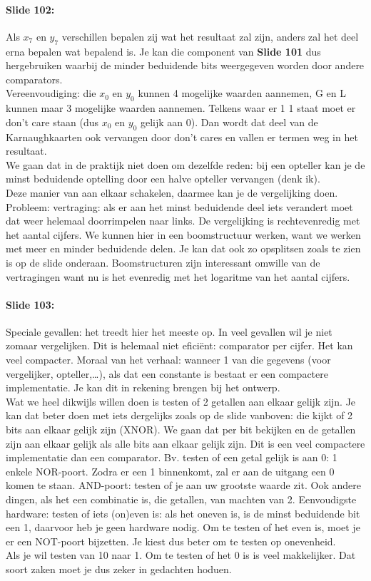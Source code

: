 \documentclass[10pt,a4paper]{book}
\begin{document}
\paragraph{Slide 102:} Als $x_7$ en $y_7$ verschillen bepalen zij wat het resultaat zal zijn, anders zal het deel erna bepalen wat bepalend is. Je kan die component van \textbf{Slide 101} dus hergebruiken waarbij de minder beduidende bits weergegeven worden door andere comparators.\\
Vereenvoudiging: die $x_0$ en $y_0$ kunnen 4 mogelijke waarden aannemen, G en L kunnen maar 3 mogelijke waarden aannemen. Telkens waar er 1 1 staat moet er don't care staan (dus $x_0$ en $y_0$ gelijk aan 0). Dan wordt dat deel van de Karnaughkaarten ook vervangen door don't cares en vallen er termen weg in het resultaat.\\
We gaan dat in de praktijk niet doen om dezelfde reden: bij een opteller kan je de minst beduidende optelling door een halve opteller vervangen (denk ik).\\
Deze manier van aan elkaar schakelen, daarmee kan je de vergelijking doen. Probleem: vertraging: als er aan het minst beduidende deel iets verandert moet dat weer helemaal doorrimpelen naar links. De vergelijking is rechtevenredig met het aantal cijfers. We kunnen hier in een boomstructuur werken, want we werken met meer en minder beduidende delen. Je kan dat ook zo opsplitsen zoals te zien is op de slide onderaan. Boomstructuren zijn interessant omwille van de vertragingen want nu is het evenredig met het logaritme van het aantal cijfers.

\paragraph{Slide 103:} Speciale gevallen: het treedt hier het meeste op. In veel gevallen wil je niet zomaar vergelijken. Dit is helemaal niet efici\"ent: comparator per cijfer. Het kan veel compacter. Moraal van het verhaal: wanneer 1 van die gegevens (voor vergelijker, opteller,\ldots), als dat een constante is bestaat er een compactere implementatie. Je kan dit in rekening brengen bij het ontwerp.\\
Wat we heel dikwijls willen doen is testen of 2 getallen aan elkaar gelijk zijn. Je kan dat beter doen met iets dergelijks zoals op de slide vanboven: die kijkt of 2 bits aan elkaar gelijk zijn (XNOR). We gaan dat per bit bekijken en de getallen zijn aan elkaar gelijk als alle bits aan elkaar gelijk zijn. Dit is een veel compactere implementatie dan een comparator. Bv. testen of een getal gelijk is aan 0: 1 enkele NOR-poort. Zodra er een 1 binnenkomt, zal er aan de uitgang een 0 komen te staan. AND-poort: testen of je aan uw grootste waarde zit. Ook andere dingen, als het een combinatie is, die getallen, van machten van 2. Eenvoudigste hardware: testen of iets (on)even is: als het oneven is, is de minst beduidende bit een 1, daarvoor heb je geen hardware nodig. Om te testen of het even is, moet je er een NOT-poort bijzetten. Je kiest dus beter om te testen op onevenheid.\\
Als je wil testen van 10 naar 1. Om te testen of het 0 is is veel makkelijker. Dat soort zaken moet je dus zeker in gedachten hoduen.
\end{document}
